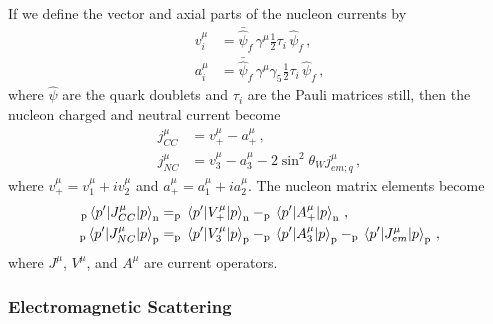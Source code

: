   If we define the vector and axial parts of the nucleon currents by
  \begin{equation}
    \begin{aligned}
    v^{\mu}_i &= \bar{\hat{\psi}}_f\, \gamma^{\mu}\frac{1}{2}\tau_i\, \hat{\psi}_f \,, \\
    a^{\mu}_i &= \bar{\hat{\psi}}_f\, \gamma^{\mu}\gamma_5\frac{1}{2}\tau_i\, \hat{\psi}_f \,,
    \end{aligned}
  \end{equation}
  where $\hat{\psi}$ are the quark doublets and $\tau_i$ are the Pauli matrices
  still, then the nucleon charged and neutral current become
  \begin{equation}
    \begin{aligned}
      j^{\mu}_{CC} &= v^{\mu}_+ - a^{\mu}_+ \,, \\
      j^{\mu}_{NC} &= v^{\mu}_3 - a^{\mu}_3 - 2\sin^2\theta_W j^{\mu}_{em;q} \,,
    \end{aligned}
  \end{equation}
  where $v^{\mu}_+ = v^{\mu}_1 + iv^{\mu}_2$ and $a^{\mu}_+ = a^{\mu}_1 +
  ia^{\mu}_2$. The nucleon matrix elements become
  \begin{equation}
    \begin{aligned}
      _{\textrm{p}}\mel{p'}{J^{\mu}_{CC}}{p}_{\textrm{n}}
          &= _{\textrm{p}}\mel{p'}{V^{\mu}_{+}}{p}_{\textrm{n}}
            - _{\textrm{p}}\mel{p'}{A^{\mu}_{+}}{p}_{\textrm{n}} \,, \\
      _{\textrm{p}}\mel{p'}{J^{\mu}_{NC}}{p}_{\textrm{p}}
          &= _{\textrm{p}}\mel{p'}{V^{\mu}_{3}}{p}_{\textrm{p}} 
            - _{\textrm{p}}\mel{p'}{A^{\mu}_{3}}{p}_{\textrm{p}} 
            - _{\textrm{p}}\mel{p'}{J^{\mu}_{em}}{p}_{\textrm{p}} \,,
    \end{aligned}
  \end{equation}
  where $J^{\mu}$, $V^{\mu}$, and $A^{\mu}$ are current operators.

  \subsubsection{Electromagnetic Scattering}

